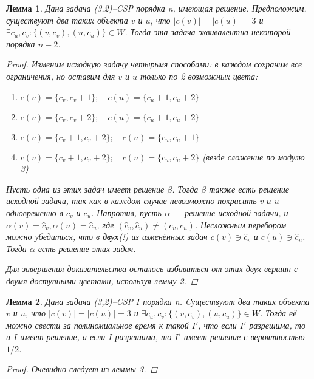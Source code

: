 \documentclass[fleqn]{article}
\theoremstyle{plain}
\theoremstyle{plain}
\theoremstyle{plain}
\newtheorem{lemma}{Лемма}
\theoremstyle{definition}
\begin{document}
\begin{lemma}
	Дана задача (3,2)--CSP порядка n, имеющая решение. Предположим, существуют два таких объекта $v$ и $u$, что $|c(v)| = |c(u)| = 3$ и $\exists c_u, c_v : \{(v, c_v), (u, c_u)\} \in W$. Тогда эта задача эквивалентна некоторой порядка $n-2$.
	\begin{proof}
		Изменим исходную задачу четырьмя способами: в каждом сохраним все ограничения, но оставим для $v$ и $u$ только по 2 возможных цвета:
		\begin{enumerate}
			\item $c(v) = \{c_v, c_v+1\}; \quad c(u) = \{c_u+1, c_u+2\}$
			\item $c(v) = \{c_v, c_v+2\}; \quad c(u) = \{c_u+1, c_u+2\}$
			\item $c(v) = \{c_v+1, c_v+2\}; \quad c(u) = \{c_u, c_u+1\}$
			\item $c(v) = \{c_v+1, c_v+2\}; \quad c(u) = \{c_u, c_u+2\}$ (везде сложение по модулю 3)
		\end{enumerate}
		Пусть одна из этих задач имеет решение $\beta$. Тогда $\beta$ также есть решение исходной задачи, так как в каждом случае невозможно покрасить $v$ и $u$ одновременно в $c_v$ и $c_u$. Напротив, пусть $\alpha$ --- решение исходной задачи, и $\alpha(v) = \widehat{c}_v, \alpha(u) = \widehat{c}_u$, где $(\widehat{c}_v, \widehat{c}_u) \not= (c_v, c_u)$. Несложным перебором можно убедиться, что в \textbf{двух}(!) из изменённых задач $c(v) \ni \widehat{c}_v$ и $c(u) \ni \widehat{c}_u$. Тогда $\alpha$ есть решение этих задач.
		
		Для завершения доказательства осталось избавиться от этих двух вершин с двумя доступными цветами, используя лемму 2.
	\end{proof}
\end{lemma}

\begin{lemma}
	Дана задача (3,2)--CSP $I$ порядка n. Cуществуют два таких объекта $v$ и $u$, что $|c(v)| = |c(u)| = 3$ и $\exists c_u, c_v : \{(v, c_v), (u, c_u)\} \in W$. Тогда её можно свести за полиномиальное время к такой $I'$, что если $I'$ разрешима, то и $I$ имеет решение, а если $I$ разрешима, то $I'$ имеет решение с вероятностью $1/2$.
	\begin{proof}
		Очевидно следует из леммы 3.
	\end{proof}
\end{lemma}
\end{document}
